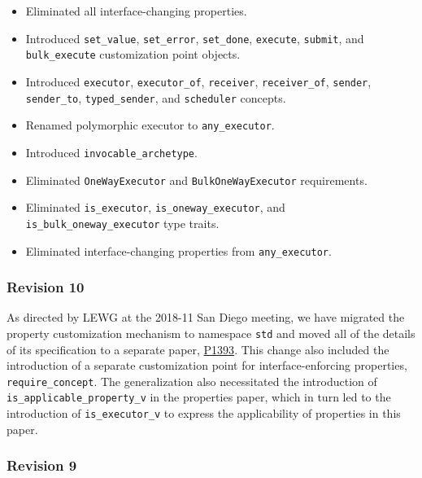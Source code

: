 \documentclass[a4paper,12pt,notitlepage,twoside,openright]{article}
\begin{document}
\begin{itemize}

\item
  Eliminated all interface-changing properties.
\item
  Introduced \texttt{set_value},
  \texttt{set_error}, \texttt{set_done},
  \texttt{execute}, \texttt{submit}, and
  \texttt{bulk_execute} customization point objects.
\item
  Introduced \texttt{executor},
  \texttt{executor_of}, \texttt{receiver},
  \texttt{receiver_of}, \texttt{sender},
  \texttt{sender_to}, \texttt{typed_sender}, and
  \texttt{scheduler} concepts.
\item
  Renamed polymorphic executor to \texttt{any_executor}.
\item
  Introduced \texttt{invocable_archetype}.
\item
  Eliminated \texttt{OneWayExecutor} and
  \texttt{BulkOneWayExecutor} requirements.
\item
  Eliminated \texttt{is_executor},
  \texttt{is_oneway_executor}, and
  \texttt{is_bulk_oneway_executor} type traits.
\item
  Eliminated interface-changing properties from
  \texttt{any_executor}.
\end{itemize}

\hypertarget{revision-10}{%
\subsubsection{Revision 10}\label{revision-10}}

As directed by LEWG at the 2018-11 San Diego meeting, we have migrated
the property customization mechanism to namespace
\texttt{std} and moved all of the details of its
specification to a separate paper, \href{http://wg21.link/P1393}{P1393}.
This change also included the introduction of a separate customization
point for interface-enforcing properties,
\texttt{require_concept}. The generalization also
necessitated the introduction of
\texttt{is_applicable_property_v} in the properties paper,
which in turn led to the introduction of
\texttt{is_executor_v} to express the applicability of
properties in this paper.

\hypertarget{revision-9}{%
\subsubsection{Revision 9}\label{revision-9}}
\end{document}

